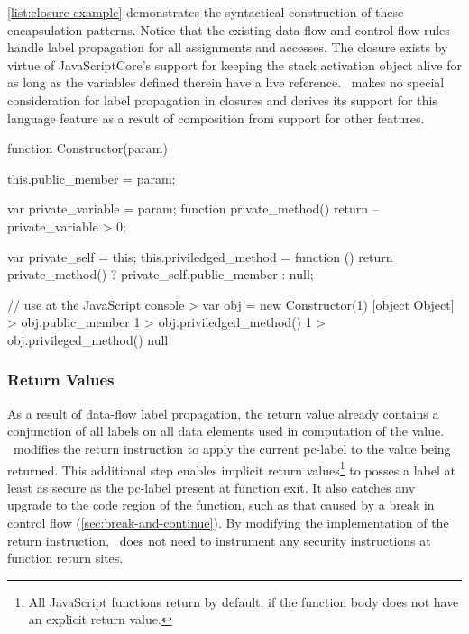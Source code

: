 \autoref{list:closure-example} demonstrates the syntactical construction of these encapsulation patterns.
Notice that the existing data-flow and control-flow rules handle label propagation for all assignments and accesses.
The closure exists by virtue of JavaScriptCore's support for keeping the stack activation object alive for as long as the variables defined therein have a live reference.
\FlowCore\ makes no special consideration for label propagation in closures and derives its support for this language feature as a result of composition from support for other features.

\begin{jscode}
function Constructor(param) {
    this.public_member = param;

    var private_variable = param;
    function private_method() {
        return --private_variable > 0;
    }

    var private_self = this;
    this.priviledged_method = function () {
        return private_method() ? private_self.public_member : null;
    }
}

// use at the JavaScript console
> var obj = new Constructor(1)
[object Object]
> obj.public_member
1
> obj.priviledged_method()
1
> obj.privileged_method()
null
\end{jscode}

\subsubsection{Return Values}

As a result of data-flow label propagation, the return value already contains a conjunction of all labels on all data elements used in computation of the value.
\FlowCore\ modifies the return instruction to apply the current pc-label to the value being returned.
This additional step enables implicit return values\footnote{All JavaScript functions return  by default, if the function body does not have an explicit return value.} to posses a label at least as secure as the pc-label present at function exit.
It also catches any upgrade to the code region of the function, such as that caused by a break in control flow (\autoref{sec:break-and-continue}).
By modifying the implementation of the return instruction, \FlowCore\ does not need to instrument any security instructions at function return sites.


